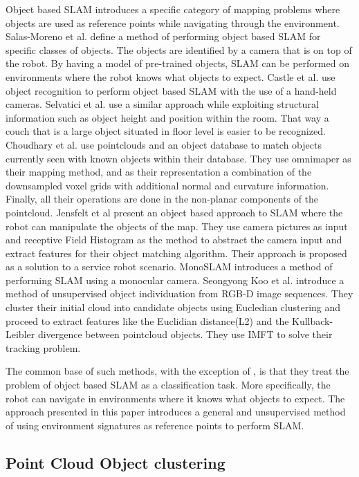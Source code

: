 \documentclass[twoside,hidelinks]{article}
\begin{document}
Object based SLAM introduces a specific category of mapping problems where objects are used as reference points while navigating through the environment.
Salas-Moreno et al.\cite{SLAM++} define a method of performing object based SLAM for specific classes of objects. The objects are identified by a camera that is on top of the robot. By having a model of pre-trained objects, SLAM can be performed on environments where the robot knows what objects to expect.
Castle et al. use object recognition to perform object based SLAM with the use of a hand-held cameras. Selvatici et al.\cite{objSLAM} use a similar approach while exploiting structural information such as object height and position within the room. That way a couch that is a large object situated in floor level is easier to be recognized.
Choudhary et al.\cite{objectpointSLAM} use pointclouds and an object database to match objects currently seen with known objects within their database. They use omnimaper\cite{omnimaper} as their mapping method, and as their representation a combination of the downsampled voxel grids with additional normal and curvature information.  Finally, all their operations are done in the non-planar components of the pointcloud.
Jensfelt et al\cite{objSLAM} present an object based approach to SLAM where the robot can manipulate the objects of the map. They use camera pictures as input and receptive Field Histogram as the method to abstract the camera input and extract features for their object matching algorithm. Their approach is proposed as a solution to a service robot scenario.
MonoSLAM\cite{monoSLAM} introduces a method of performing SLAM using a monocular camera. 
Seongyong Koo et al.\cite{objectDisc} introduce a method of unsupervised object individuation from RGB-D image sequences. They cluster their initial cloud into candidate objects using Eucledian clustering and proceed to extract features like the Euclidian distance(L2) and the Kullback-Leibler divergence between pointcloud objects. They use IMFT to solve their tracking problem.

The common base of such methods, with the exception of \cite{objectDisc}, is that they treat the problem of object based SLAM as a classification task. More specifically, the robot can navigate in environments where it knows what objects to expect.
The approach presented in this paper introduces a general and unsupervised method of using environment signatures as reference points to perform SLAM.

\subsection{Point Cloud Object clustering}
\end{document}
